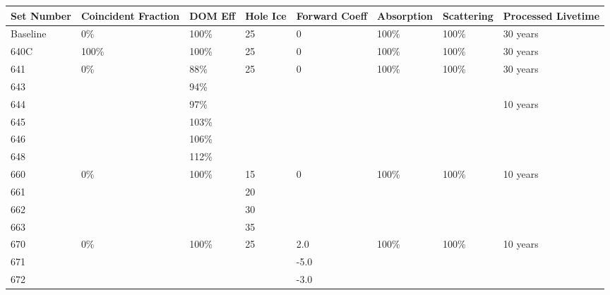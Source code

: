 \begin{landscape}
\begin{table}[]
\centering
\begin{tabular}{@{}llllllll@{}}
\toprule
Set Number & Coincident Fraction & DOM Eff & Hole Ice & Forward Coeff & Absorption & Scattering & Processed Livetime \\ \midrule
Baseline  & 0\%                 & 100\%   & 25       & 0             & 100\%      & 100\%      & 30 years \\ \midrule
640C      & 100\%               & 100\%   & 25       & 0             & 100\%      & 100\%      & 30 years \\ \midrule
641        & 0\%                 & 88\%    & 25       & 0             & 100\%      & 100\%      & 30 years \\
643        &                     & 94\%    &          &               &            &            &          \\
644        &                     & 97\%    &          &               &            &            & 10 years         \\
645        &                     & 103\%   &          &               &            &            &          \\
646        &                     & 106\%   &          &               &            &            &          \\
648        &                     & 112\%   &          &               &            &            &          \\ \midrule
660        & 0\%                 & 100\%   & 15       & 0             & 100\%      & 100\%      & 10 years \\
661        &                     &         & 20       &               &            &            &          \\
662        &                     &         & 30       &               &            &            &          \\
663        &                     &         & 35       &               &            &            &          \\ \midrule
670        & 0\%              & 100\%  & 25 & 2.0           & 100\%  & 100\%  & 10 years \\ 
671        &                     &         &          & -5.0          &            &            &         \\
672        &                     &         &          & -3.0          &            &            &          \\

\end{tabular}
\end{table}
\end{landscape}

